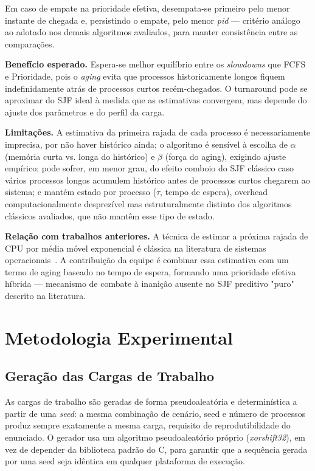 \documentclass[conference]{IEEEtran}
\begin{document}
Em caso de empate na prioridade efetiva, desempata-se primeiro pelo menor instante de chegada e, persistindo o empate, pelo menor \textit{pid} — critério análogo ao adotado nos demais algoritmos avaliados, para manter consistência entre as comparações.

\textbf{Benefício esperado.} Espera-se melhor equilíbrio entre os \textit{slowdowns} que FCFS e Prioridade, pois o \textit{aging} evita que processos historicamente longos fiquem indefinidamente atrás de processos curtos recém-chegados. O turnaround pode se aproximar do SJF ideal à medida que as estimativas convergem, mas depende do ajuste dos parâmetros e do perfil da carga.

\textbf{Limitações.} A estimativa da primeira rajada de cada processo é necessariamente imprecisa, por não haver histórico ainda; o algoritmo é sensível à escolha de $\alpha$ (memória curta vs. longa do histórico) e $\beta$ (força do aging), exigindo ajuste empírico; pode sofrer, em menor grau, do efeito comboio do SJF clássico caso vários processos longos acumulem histórico antes de processos curtos chegarem ao sistema; e mantém estado por processo ($\tau$, tempo de espera), overhead computacionalmente desprezível mas estruturalmente distinto dos algoritmos clássicos avaliados, que não mantêm esse tipo de estado.

\textbf{Relação com trabalhos anteriores.} A técnica de estimar a próxima rajada de CPU por média móvel exponencial é clássica na literatura de sistemas operacionais~\cite{silberschatz2018}. A contribuição da equipe é combinar essa estimativa com um termo de aging baseado no tempo de espera, formando uma prioridade efetiva híbrida — mecanismo de combate à inanição ausente no SJF preditivo "puro" descrito na literatura.

\section{Metodologia Experimental}

\subsection{Geração das Cargas de Trabalho}
\label{sec:geracao-cargas}

As cargas de trabalho são geradas de forma pseudoaleatória e determinística a partir de uma \textit{seed}: a mesma combinação de cenário, seed e número de processos produz sempre exatamente a mesma carga, requisito de reprodutibilidade do enunciado. O gerador usa um algoritmo pseudoaleatório próprio (\textit{xorshift32}), em vez de depender da biblioteca padrão do C, para garantir que a sequência gerada por uma seed seja idêntica em qualquer plataforma de execução.
\end{document}
